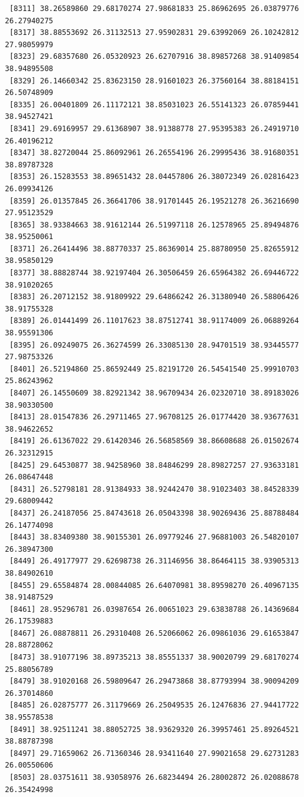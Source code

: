 \documentclass[
  letterpaper,
  DIV=11,
  numbers=noendperiod]{scrartcl}
\begin{document}
\begin{verbatim}
 [8311] 38.26589860 29.68170274 27.98681833 25.86962695 26.03879776 26.27940275
 [8317] 38.88553692 26.31132513 27.95902831 29.63992069 26.10242812 27.98059979
 [8323] 29.68357680 26.05320923 26.62707916 38.89857268 38.91409854 38.94895508
 [8329] 26.14660342 25.83623150 28.91601023 26.37560164 38.88184151 26.50748909
 [8335] 26.00401809 26.11172121 38.85031023 26.55141323 26.07859441 38.94527421
 [8341] 29.69169957 29.61368907 38.91388778 27.95395383 26.24919710 26.40196212
 [8347] 38.82720044 25.86092961 26.26554196 26.29995436 38.91680351 38.89787328
 [8353] 26.15283553 38.89651432 28.04457806 26.38072349 26.02816423 26.09934126
 [8359] 26.01357845 26.36641706 38.91701445 26.19521278 26.36216690 27.95123529
 [8365] 38.93384663 38.91612144 26.51997118 26.12578965 25.89494876 38.95250061
 [8371] 26.26414496 38.88770337 25.86369014 25.88780950 25.82655912 38.95850129
 [8377] 38.88828744 38.92197404 26.30506459 26.65964382 26.69446722 38.91020265
 [8383] 26.20712152 38.91809922 29.64866242 26.31380940 26.58806426 38.91755328
 [8389] 26.01441499 26.11017623 38.87512741 38.91174009 26.06889264 38.95591306
 [8395] 26.09249075 26.36274599 26.33085130 28.94701519 38.93445577 27.98753326
 [8401] 26.52194860 25.86592449 25.82191720 26.54541540 25.99910703 25.86243962
 [8407] 26.14550609 38.82921342 38.96709434 26.02320710 38.89183026 38.90330500
 [8413] 28.01547836 26.29711465 27.96708125 26.01774420 38.93677631 38.94622652
 [8419] 26.61367022 29.61420346 26.56858569 38.86608688 26.01502674 26.32312915
 [8425] 29.64530877 38.94258960 38.84846299 28.89827257 27.93633181 26.08647448
 [8431] 26.52798181 28.91384933 38.92442470 38.91023403 38.84528339 29.68009442
 [8437] 26.24187056 25.84743618 26.05043398 38.90269436 25.88788484 26.14774098
 [8443] 38.83409380 38.90155301 26.09779246 27.96881003 26.54820107 26.38947300
 [8449] 26.49177977 29.62698738 26.31146956 38.86464115 38.93905313 38.84902610
 [8455] 29.65584874 28.00844085 26.64070981 38.89598270 26.40967135 38.91487529
 [8461] 28.95296781 26.03987654 26.00651023 29.63838788 26.14369684 26.17539883
 [8467] 26.08878811 26.29310408 26.52066062 26.09861036 29.61653847 28.88728062
 [8473] 38.91077196 38.89735213 38.85551337 38.90020799 29.68170274 25.88056789
 [8479] 38.91020168 26.59809647 26.29473868 38.87793994 38.90094209 26.37014860
 [8485] 26.02875777 26.31179669 26.25049535 26.12476836 27.94417722 38.95578538
 [8491] 38.92511241 38.88052725 38.93629320 26.39957461 25.89264521 38.88787398
 [8497] 29.71659062 26.71360346 28.93411640 27.99021658 29.62731283 26.00550606
 [8503] 28.03751611 38.93058976 26.68234494 26.28002872 26.02088678 26.35424998

\end{verbatim}
\end{document}
